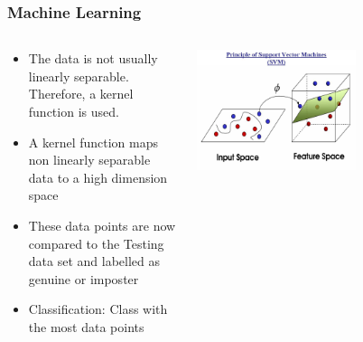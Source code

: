 \documentclass{beamer}
\begin{document}
\begin{frame}
\frametitle{Machine Learning}
 \begin{columns}
  \begin{column}{.6\textwidth}
  \begin{itemize}
  		\item The data is not usually linearly separable. Therefore, a kernel function is used.
		\item A kernel function maps non linearly separable data to a high dimension space 
		\item These data points are now compared to the Testing data set and labelled as genuine or imposter
		\item Classification: Class with the most data points
  \end{itemize}
  \end{column}
  \begin{column}{0.6\textwidth}
   \includegraphics[width=0.6\textwidth]{Illustrations/svm.jpg}
       \\
  \end{column}
  \end{columns}  
\end{frame}
\end{document}

